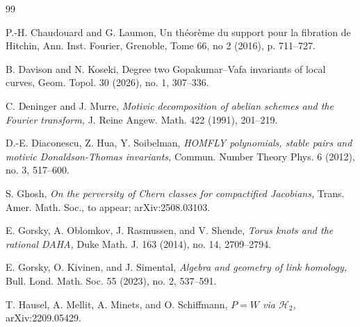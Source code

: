 \documentclass{pspum-l}
\theoremstyle{plain}
\theoremstyle{definition}
\theoremstyle{remark}
\begin{document}
\begin{thebibliography}{99}


 P.-H. Chaudouard and G. Laumon, Un th\'eor\`eme du support pour la fibration de Hitchin, Ann. Inst. Fourier,
Grenoble, Tome 66, no 2 (2016), p. 711--727.


 B. Davison and N. Koseki, {Degree two Gopakumar--Vafa invariants of local curves,} Geom. Topol. 30 (2026), no. 1, 307--336.




 C. Deninger and J. Murre, {\em Motivic decomposition of abelian schemes and the Fourier transform,} J. Reine Angew. Math. 422 (1991), 201--219.


 D.-E. Diaconescu, Z. Hua, Y. Soibelman, {\em HOMFLY polynomials, stable
pairs and motivic Donaldson-Thomas invariants,} Commun. Number Theory Phys. 6 (2012), no. 3, 517--600.

 S. Ghosh, {\em On the perversity of Chern classes for compactified Jacobians,} Trans. Amer. Math. Soc., to appear; arXiv:2508.03103.



 E. Gorsky, A. Oblomkov, J. Rasmussen, and V. Shende, {\em Torus knots and the rational DAHA,} Duke Math. J. 163 (2014), no. 14, 2709--2794.

 E. Gorsky, O. Kivinen, and J. Simental, {\em Algebra and geometry of link homology,} Bull. Lond. Math. Soc. 55 (2023), no. 2, 537--591.










 T. Hausel, A. Mellit, A. Minets, and O. Schiffmann, {\em $P = W$ via $\mathcal{H}_2$,} arXiv:2209.05429.






\end{thebibliography}
\end{document}
